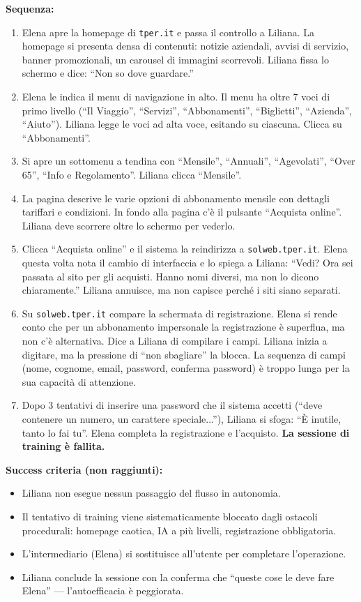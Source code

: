 \documentclass[11pt,a4paper]{article}
\begin{document}
\begin{tcolorbox}[colback=backgroundColor,colframe=borderColor,arc=2mm]
{    \textbf{Sequenza:}
    \begin{enumerate}
        \item Elena apre la homepage di \texttt{tper.it} e passa il controllo a Liliana. La homepage si presenta densa di contenuti: notizie aziendali, avvisi di servizio, banner promozionali, un carousel di immagini scorrevoli. Liliana fissa lo schermo e dice: ``Non so dove guardare.''
        \item Elena le indica il menu di navigazione in alto. Il menu ha oltre 7 voci di primo livello (``Il Viaggio'', ``Servizi'', ``Abbonamenti'', ``Biglietti'', ``Azienda'', ``Aiuto''). Liliana legge le voci ad alta voce, esitando su ciascuna. Clicca su ``Abbonamenti''.
        \item Si apre un sottomenu a tendina con ``Mensile'', ``Annuali'', ``Agevolati'', ``Over 65'', ``Info e Regolamento''. Liliana clicca ``Mensile''.
        \item La pagina descrive le varie opzioni di abbonamento mensile con dettagli tariffari e condizioni. In fondo alla pagina c'è il pulsante ``Acquista online''. Liliana deve scorrere oltre lo schermo per vederlo.
        \item Clicca ``Acquista online'' e il sistema la reindirizza a \texttt{solweb.tper.it}. Elena questa volta nota il cambio di interfaccia e lo spiega a Liliana: ``Vedi? Ora sei passata al sito per gli acquisti. Hanno nomi diversi, ma non lo dicono chiaramente.'' Liliana annuisce, ma non capisce perché i siti siano separati.
        \item Su \texttt{solweb.tper.it} compare la schermata di registrazione. Elena si rende conto che per un abbonamento impersonale la registrazione è superflua, ma non c'è alternativa. Dice a Liliana di compilare i campi. Liliana inizia a digitare, ma la pressione di ``non sbagliare'' la blocca. La sequenza di campi (nome, cognome, email, password, conferma password) è troppo lunga per la sua capacità di attenzione.
        \item Dopo 3 tentativi di inserire una password che il sistema accetti (``deve contenere un numero, un carattere speciale...''), Liliana si sfoga: ``È inutile, tanto lo fai tu''. Elena completa la registrazione e l'acquisto. \textbf{La sessione di training è fallita.}
    \end{enumerate}

    \textbf{Success criteria (non raggiunti):}
    \begin{itemize}
        \item Liliana non esegue nessun passaggio del flusso in autonomia.
        \item Il tentativo di training viene sistematicamente bloccato dagli ostacoli procedurali: homepage caotica, IA a più livelli, registrazione obbligatoria.
        \item L'intermediario (Elena) si sostituisce all'utente per completare l'operazione.
        \item Liliana conclude la sessione con la conferma che ``queste cose le deve fare Elena'' --- l'autoefficacia è peggiorata.
    \end{itemize}

}
\end{tcolorbox}
\end{document}
